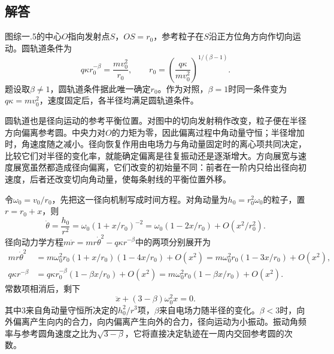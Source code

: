 \documentclass[UTF8,fontset=fandol,a4paper,11pt]{ctexart}
\begin{document}
\subsection*{解答}


图综一.5的中心$O$指向发射点$S$，$OS=r_0$，参考粒子在$S$沿正方位角方向作切向运动。圆轨道条件为
\[
q\kappa r_0^{-\beta}=\frac{mv_0^2}{r_0},
\qquad
\boxed{r_0=\left(\frac{q\kappa}{mv_0^2}\right)^{1/(\beta-1)}}.
\]
题设取$\beta\ne1$，圆轨道条件据此唯一确定$r_0$。作为对照，$\beta=1$时同一条件变为$q\kappa=mv_0^2$，速度固定后，各半径均满足圆轨道条件。

圆轨道也是径向运动的参考平衡位置。对图中的切向发射稍作改变，粒子便在半径方向偏离参考圆。中央力对$O$的力矩为零，因此偏离过程中角动量守恒；半径增加时，角速度随之减小。径向恢复作用由电场力与角动量固定时的离心项共同决定，比较它们对半径的变化率，就能确定偏离是往复振动还是逐渐增大。方向展宽与速度展宽虽然都造成径向偏离，它们改变的初始量不同：前者在一阶内只给出径向初速度，后者还改变切向角动量，使每条射线的平衡位置外移。

令$\omega_0=v_0/r_0$，先把这一径向机制写成时间方程。对角动量为$h_0=r_0^2\omega_0$的粒子，置$r=r_0+x$，则
\[
\dot\theta=\frac{h_0}{r^2}
=\omega_0(1+x/r_0)^{-2}
=\omega_0(1-2x/r_0)+O(x^2/r_0^2).
\]
径向动力学方程$m\ddot r=mr\dot\theta^2-q\kappa r^{-\beta}$中的两项分别展开为
\[
\begin{aligned}
mr\dot\theta^2&=m\omega_0^2r_0(1+x/r_0)(1-4x/r_0)+O(x^2)
=m\omega_0^2r_0(1-3x/r_0)+O(x^2),\\
q\kappa r^{-\beta}&=q\kappa r_0^{-\beta}(1-\beta x/r_0)+O(x^2)
=m\omega_0^2r_0(1-\beta x/r_0)+O(x^2).
\end{aligned}
\]
常数项相消后，剩下
\[
\ddot x+(3-\beta)\omega_0^2x=0.
\]
其中$3$来自角动量守恒所决定的$h_0^2/r^3$项，$\beta$来自电场力随半径的变化。$\beta<3$时，向外偏离产生向内的合力，向内偏离产生向外的合力，径向运动为小振动。振动角频率与参考圆角速度之比为$\sqrt{3-\beta}$，它将直接决定轨迹在一周内交回参考圆的次数。
\end{document}
